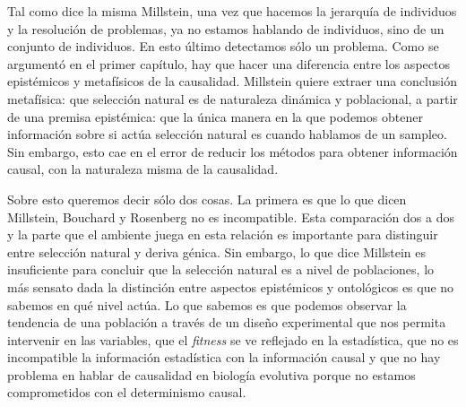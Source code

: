 Tal como dice la misma Millstein, una vez que hacemos la jerarquía de individuos y la resolución de problemas, ya no estamos hablando de individuos, sino de un conjunto de individuos. En esto último detectamos sólo un problema. Como se argumentó en el primer capítulo, hay que hacer una diferencia entre los aspectos epistémicos y metafísicos de la causalidad. Millstein quiere extraer una conclusión metafísica: que selección natural es de naturaleza dinámica y poblacional, a partir de una premisa epistémica: que la única manera en la que podemos obtener información sobre si actúa selección natural es cuando hablamos de un sampleo. Sin embargo, esto cae en el error de reducir los métodos para obtener información causal, con la naturaleza misma de la causalidad.

Sobre esto queremos decir sólo dos cosas. La primera es que lo que dicen Millstein, Bouchard y Rosenberg no es incompatible. Esta comparación dos a dos y la parte que el ambiente juega en esta relación es importante para distinguir entre selección natural y deriva génica. Sin embargo, lo que dice Millstein es insuficiente para concluir que la selección natural es a nivel de poblaciones, lo más sensato dada la distinción entre aspectos epistémicos y ontológicos es que no sabemos en qué nivel actúa. Lo que sabemos es que podemos observar la tendencia de una población a través de un diseño experimental que nos permita intervenir en las variables, que el \emph{fitness} se ve reflejado en la estadística, que no es incompatible la información estadística con la información causal y que no hay problema en hablar de causalidad en biología evolutiva porque no estamos comprometidos con el determinismo causal.
